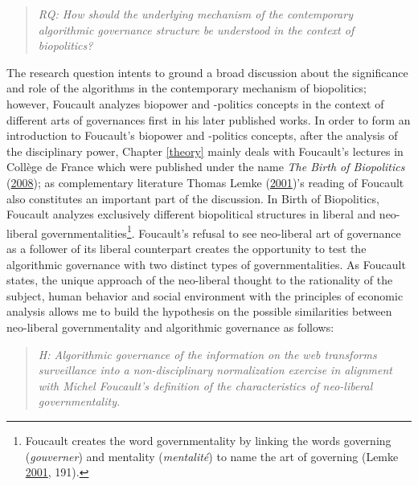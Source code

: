 \documentclass[12pt,twoside]{report}
\let\rmarkdownfootnote\footnote%
\def\footnote{\protect\rmarkdownfootnote}
\begin{document}
\begin{quote}
\emph{RQ: How should the underlying mechanism of the contemporary algorithmic governance structure be understood in the context of biopolitics?}
\end{quote}

The research question intents to ground a broad discussion about the significance and role of the algorithms in the contemporary mechanism of biopolitics; however, Foucault analyzes biopower and -politics concepts in the context of different arts of governances first in his later published works. In order to form an introduction to Foucault's biopower and -politics concepts, after the analysis of the disciplinary power, Chapter \ref{theory} mainly deals with Foucault's lectures in Collège de France which were published under the name \emph{The Birth of Biopolitics} (\protect\hyperlink{ref-Foucault2008}{2008}); as complementary literature Thomas Lemke (\protect\hyperlink{ref-Lemke2001}{2001})'s reading of Foucault also constitutes an important part of the discussion. In Birth of Biopolitics, Foucault analyzes exclusively different biopolitical structures in liberal and neo-liberal governmentalities\footnote{Foucault creates the word governmentality by linking the words governing (\emph{gouverner}) and mentality (\emph{mentalité}) to name the art of governing (Lemke \protect\hyperlink{ref-Lemke2001}{2001}, 191).}. Foucault's refusal to see neo-liberal art of governance as a follower of its liberal counterpart creates the opportunity to test the algorithmic governance with two distinct types of governmentalities. As Foucault states, the unique approach of the neo-liberal thought to the rationality of the subject, human behavior and social environment with the principles of economic analysis allows me to build the hypothesis on the possible similarities between neo-liberal governmentality and algorithmic governance as follows:

\begin{quote}
\emph{H: Algorithmic governance of the information on the web transforms surveillance into a non-disciplinary normalization exercise in alignment with Michel Foucault's definition of the characteristics of neo-liberal governmentality.}
\end{quote}
\end{document}
